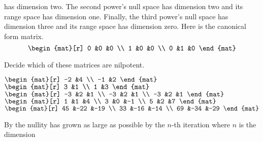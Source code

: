 \begin{exercises}
\begin{answer}
\begin{exparts}
          has dimension two.
          The second power's null space has dimension two and its range space
          has dimension one.
          Finally, the third power's null space has dimension three 
          and its range space
          has dimension zero.
          Here is the canonical form matrix.
          \begin{equation*}
            \begin{mat}[r]
              0  &0  &0  \\
              1  &0  &0  \\
              0  &1  &0 
            \end{mat}
          \end{equation*}
      \end{exparts}
    \end{answer}
  \item 
    Decide which of these matrices are nilpotent.
    \begin{exparts*}
      \partsitem 
        $\begin{mat}[r]
           -2  &4  \\
           -1  &2
        \end{mat}$
      \partsitem 
        $\begin{mat}[r]
          3  &1  \\
          1  &3
        \end{mat}$
      \partsitem 
        $\begin{mat}[r]
          -3  &2  &1  \\
          -3  &2  &1  \\
          -3  &2  &1
        \end{mat}$
      \partsitem 
        $\begin{mat}[r]
           1  &1  &4  \\
           3  &0  &-1 \\
           5  &2  &7
        \end{mat}$
      \partsitem 
        $\begin{mat}[r]
           45  &-22  &-19  \\
           33  &-16  &-14  \\
           69  &-34  &-29
        \end{mat}$
    \end{exparts*}
    \begin{answer}
      By  the nullity has grown as 
      large as possible by the $n$-th iteration where $n$ is the dimension

\end{answer}
\end{exercises}
